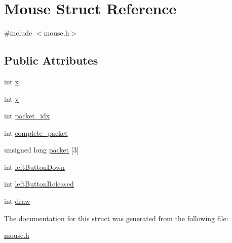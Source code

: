 \hypertarget{structMouse}{}\section{Mouse Struct Reference}
\label{structMouse}


{\ttfamily \#include $<$mouse.\+h$>$}

\subsection*{Public Attributes}
\begin{DoxyCompactItemize}
\item 
int \hyperlink{group__Mouse_ga136eea114b70f46392b89cc3779d4291}{x}
\item 
int \hyperlink{group__Mouse_ga4a29b1c18faaa2fbe39ff985ba9d6737}{y}
\item 
int \hyperlink{group__Mouse_ga1fc496df2223cb17437b296acbe02e50}{packet\+\_\+idx}
\item 
int \hyperlink{group__Mouse_ga64798c8dfb1b60b4ce76bc9859719077}{complete\+\_\+packet}
\item 
unsigned long \hyperlink{group__Mouse_ga8bfb0c35eb14423f5086a355d52dc733}{packet} \mbox{[}3\mbox{]}
\item 
int \hyperlink{group__Mouse_ga401d046e1cad0fad3908120ab85b9396}{left\+Button\+Down}
\item 
int \hyperlink{group__Mouse_ga9a74cd5fb66c4936d44a72962df7830c}{left\+Button\+Released}
\item 
int \hyperlink{group__Mouse_gad3b4a3a6fd6d53630bdf7aa81d74f744}{draw}
\end{DoxyCompactItemize}


The documentation for this struct was generated from the following file\+:\begin{DoxyCompactItemize}
\item 
\hyperlink{mouse_8h}{mouse.\+h}\end{DoxyCompactItemize}
